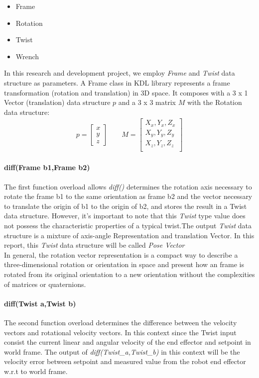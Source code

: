\documentclass[report.tex]{subfiles}
\begin{document}
    \begin{itemize}
        \item Frame 
        \item Rotation 
        \item Twist 
        \item Wrench 
    \end{itemize}
    In this research and development project, we employ \textit{Frame} and \textit{Twist} data structure as parameters.
    A Frame class in KDL library represents a frame transformation (rotation and translation) in 3D space. It composes with a 3 x 1 Vector (translation) data structure $p$ and a 3 x 3 matrix $M$ with the Rotation data structure:
    \begin{align}
        p = \begin{bmatrix}
            x\\y\\z
        \end{bmatrix} \qquad
        M = \begin{bmatrix}
            X_x,Y_x,Z_x\\
            X_y,Y_y,Z_y\\
            X_z,Y_z,Z_z\\
        \end{bmatrix} 
    \end{align}
    \paragraph{\large{diff(Frame b1,Frame b2)}\\} \label{diff_frame}
    The first function overload allows \textit{diff()} determines the rotation axis necessary to rotate the frame b1 to the same orientation as frame b2 and the vector necessary to translate the origin of b1 to the origin of b2, and stores the result in a Twist data structure. However, it's important to note that this \textit{Twist} type value does not possess the characteristic properties of a typical twist.The output \textit{Twist} data structure is a mixture of axis-angle Representation and translation Vector. In this report, this \textit{Twist} data structure will be called \textit{Pose Vector} \\
    In general, the rotation vector representation is a compact way to describe a three-dimensional rotation or orientation in space and present how an frame is rotated from its original orientation to a new orientation without the complexities of matrices or quaternions. 
    \paragraph{\large{diff(Twist a,Twist b)}\\}
    The second function overload determines the difference between the velocity vectors and rotational velocity vectors. In this context since the Twist input consist the current linear and angular velocity of the end effector and setpoint in world frame. The output of \textit{diff(Twist\_a,Twist\_b)} in this context will be the velocity error between setpoint and measured value from the robot end effector w.r.t to world frame.
\end{document}
